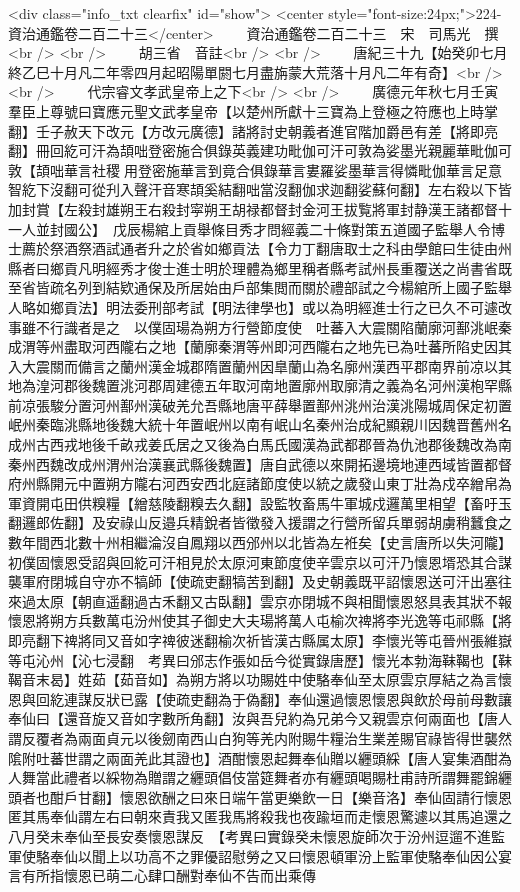 <div class="info_txt clearfix" id="show">
<center style="font-size:24px;">224-資治通鑑卷二百二十三</center>
  　　資治通鑑卷二百二十三　宋　司馬光　撰<br />
<br />
　　胡三省　音註<br />
<br />
　　唐紀三十九【始癸卯七月終乙巳十月凡二年零四月起昭陽單閼七月盡旃蒙大荒落十月凡二年有奇】<br />
<br />
　　代宗睿文孝武皇帝上之下<br />
<br />
　　廣德元年秋七月壬寅羣臣上尊號曰寶應元聖文武孝皇帝【以楚州所獻十三寶為上登極之符應也上時掌翻】壬子赦天下改元【方改元廣德】諸將討史朝義者進官階加爵邑有差【將即亮翻】冊回紇可汗為頡咄登密施合俱錄英義建功毗伽可汗可敦為娑墨光親麗華毗伽可敦【頡咄華言社稷用登密施華言到竟合俱錄華言婁羅娑墨華言得憐毗伽華言足意智紇下沒翻可從刋入聲汗音寒頡奚結翻咄當沒翻伽求迦翻娑蘇何翻】左右殺以下皆加封賞【左殺封雄朔王右殺封寜朔王胡禄都督封金河王拔覧將軍封静漢王諸都督十一人並封國公】　戊辰楊綰上貢舉條目秀才問經義二十條對策五道國子監舉人令博士薦於祭酒祭酒試通者升之於省如鄉貢法【令力丁翻唐取士之科由學館曰生徒由州縣者曰鄉貢凡明經秀才俊士進士明於理體為鄉里稱者縣考試州長重覆送之尚書省既至省皆疏名列到結欵通保及所居始由戶部集閲而關於禮部試之今楊綰所上國子監舉人略如鄉貢法】明法委刑部考試【明法律學也】或以為明經進士行之已久不可遽改事雖不行識者是之　以僕固瑒為朔方行營節度使　吐蕃入大震關陷蘭廓河鄯洮岷秦成渭等州盡取河西隴右之地【蘭廓秦渭等州即河西隴右之地先已為吐蕃所陷史因其入大震關而備言之蘭州漢金城郡隋置蘭州因臯蘭山為名廓州漢西平郡南界前凉以其地為湟河郡後魏置洮河郡周建德五年取河南地置廓州取廓清之義為名河州漢枹罕縣前凉張駿分置河州鄯州漢破羌允吾縣地唐平薛舉置鄯州洮州治漢洮陽城周保定初置岷州秦臨洮縣地後魏大統十年置岷州以南有岷山名秦州治成紀顯親川因魏晋舊州名成州古西戎地後千畝戎姜氏居之又後為白馬氏國漢為武都郡晉為仇池郡後魏改為南秦州西魏改成州渭州治漢襄武縣後魏置】唐自武德以來開拓邊境地連西域皆置都督府州縣開元中置朔方隴右河西安西北庭諸節度使以統之歲發山東丁壯為戍卒繒帛為軍資開屯田供糗糧【繒慈陵翻糗去久翻】設監牧畜馬牛軍城戍邏萬里相望【畜吁玉翻邏郎佐翻】及安祿山反邉兵精銳者皆徵發入援謂之行營所留兵單弱胡虜稍蠶食之數年間西北數十州相繼淪沒自鳳翔以西邠州以北皆為左袵矣【史言唐所以失河隴】　初僕固懷恩受詔與回紇可汗相見於太原河東節度使辛雲京以可汗乃懷恩壻恐其合謀襲軍府閉城自守亦不犒師【使疏吏翻犒苦到翻】及史朝義既平詔懷恩送可汗出塞往來過太原【朝直遥翻過古禾翻又古臥翻】雲京亦閉城不與相聞懷恩怒具表其狀不報懷恩將朔方兵數萬屯汾州使其子御史大夫瑒將萬人屯榆次禆將李光逸等屯祁縣【將即亮翻下禆將同又音如字禆彼迷翻榆次祈皆漢古縣属太原】李懷光等屯晉州張維嶽等屯沁州【沁七浸翻　考異曰邠志作張如岳今從實錄唐歷】懷光本勃海靺鞨也【靺鞨音末曷】姓茹【茹音如】為朔方將以功賜姓中使駱奉仙至太原雲京厚結之為言懷恩與回紇連謀反狀已露【使疏吏翻為于偽翻】奉仙還過懷恩懷恩與飲於母前母數讓奉仙曰【還音旋又音如字數所角翻】汝與吾兒約為兄弟今又親雲京何兩面也【唐人謂反覆者為兩面貞元以後劒南西山白狗等羌内附賜牛糧治生業差賜官祿皆得世襲然隂附吐蕃世謂之兩面羌此其證也】酒酣懷恩起舞奉仙贈以纒頭綵【唐人宴集酒酣為人舞當此禮者以綵物為贈謂之纒頭倡伎當筵舞者亦有纒頭喝賜杜甫詩所謂舞罷錦纒頭者也酣戶甘翻】懷恩欲酬之曰來日端午當更樂飲一日【樂音洛】奉仙固請行懷恩匿其馬奉仙謂左右曰朝來責我又匿我馬將殺我也夜踰垣而走懷恩驚遽以其馬追還之八月癸未奉仙至長安奏懷恩謀反　【考異曰實錄癸未懷恩旋師次于汾州逗遛不進監軍使駱奉仙以聞上以功高不之罪優詔慰勞之又曰懷恩頓軍汾上監軍使駱奉仙因公宴言有所指懷恩已萌二心肆口酬對奉仙不告而出乘傳